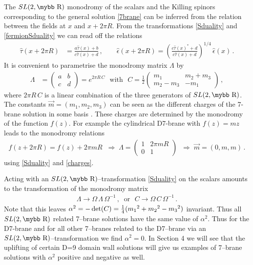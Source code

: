 \documentclass[12pt,a4paper]{article}
\def\bb#1{\hbox{\mybb#1}}
\begin{document}
The $SL(2,\bb{R})$ monodromy of the scalars and the Killing spinors
corresponding to the general solution \eqref{7brane} can be inferred from
the relation between the fields at $x$ and $x+ 2\pi R$. From the
transformations \eqref{Sduality} and \eqref{fermionSduality}
we can read off the relations
\begin{align}
  \hat \tau (x+2\pi R) &
    = \frac{a \hat \tau (x)+b}{c \hat \tau(x)+d} \,, \qquad
  \hat \epsilon (x+2 \pi R)
    = \left( \frac{c \hat \tau (x)^* +d}{c \hat \tau(x)+d} \right)^{1/4} \,
    \hat \epsilon (x) \,.
\label{monodromy}
\end{align}
It is convenient to parametrise the monodromy matrix $\Lambda$ by
\begin{align}
  \Lambda &
    = \left(
    \begin{array}{cc} a & b \\ c & d \end{array}
    \right)
    = e^{2 \pi R \, C}
     ~~~ \text{with} ~~~ C = \tfrac{1}{2} \left(
    \begin{array}{cc} m_1 & m_2+m_3 \\ m_2-m_3 & -m_1 \end{array}
    \right) \, ,
\label{charges}
\end{align}
where $2 \pi R \, C$ is a linear combination of the three generators
of $SL(2,\bb{R})$. The constants $\vec{m} = (m_1,m_2,m_3)$ can be seen as the
different charges of the 7-brane solution in some basis \cite{Meessen:1998qm}.
These charges are determined by the monodromy of the function $f(z)$.
For example the cylindrical D7-brane with  $f(z) = mz$ leads to the
monodromy relations
\begin{align}
  f(z+2\pi R) = f(z) + 2\pi mR \; \; \Rightarrow \;
  \Lambda = \left( \begin{array}{cc} 1 & 2\pi mR \\ 0 & 1\end{array} \right) \; \; \Rightarrow \;
  \vec{m} = (0,m,m) \,.
\end{align}
using \eqref{Sduality} and \eqref{charges}.

Acting with an $SL(2,\bb{R})$--transformation \eqref{Sduality}
on the scalars amounts to the transformation of the monodromy matrix
\begin{align}
  \Lambda \rightarrow \Omega \, \Lambda \, \Omega^{-1} \,, \;\; \text{or~~}
  C \rightarrow \Omega \, C \, \Omega^{-1} \,.
\label{monodromytransf}
\end{align}
Note that this leaves $\alpha^2 = -\det(C) = {\textstyle
{1\over 4}} (m_1{}^2+m_2{}^2-m_3{}^2)$ invariant. Thus all
$SL(2,\bb{R})$ related 7--brane solutions have the same value of
$\alpha^2$. Thus for the D7-brane and for all other 7--branes
related to the D7--brane via an $SL(2,\bb{R})$--transformation we
find $\alpha^2=0$. In Section 4 we will see that the uplifting of
certain D=9 domain wall solutions will give us examples of
7--brane solutions with $\alpha^2$ positive and negative as well.
\end{document}
